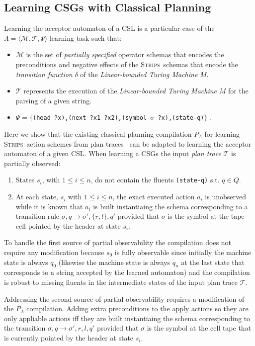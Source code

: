 \documentclass[letterpaper]{article} %
\newcommand{\tup}[1]{{\langle #1 \rangle}}
\newcommand{\strips}{\textsc{Strips}}     %
\begin{document}
\subsection{Learning CSGs with Classical Planning}
Learning the acceptor automaton of a CSL is a particular case of the $\Lambda=\tup{\mathcal{M},\mathcal{T},\Psi}$ learning task such that:
\begin{itemize}
\item $\mathcal{M}$ is the set of {\em partially specified} operator schemas that encodes the preconditions and negative effects of the \strips\ schemas that encode the {\em transition function} $\delta$ of the {\em Linear-bounded Turing Machine} $M$.
\item $\mathcal{T}$ represents the execution of the {\em Linear-bounded Turing Machine} $M$ for the parsing of a given string.
\item $\Psi=\{${\small\tt(head ?x),(next ?x1 ?x2),(symbol-$\sigma$ ?x),(state-q)}$\}$ . 
\end{itemize}

Here we show that the existing classical planning compilation $P_{\Lambda}$ for learning \strips\ action schemes from plan traces~\cite{aineto:learningSTRIPS:ICAPS2018} can be adapted to learning the acceptor automaton of a given CSL. When learning a CSGs the input {\em plan trace} $\mathcal{T}$ is partially observed:
\begin{enumerate}
\item States $s_i$, with $1\leq i\leq n$, do not contain the fluents {\tt (state-q)} s.t. $q\in Q$.
\item At each state, $s_i$ with $1\leq i\leq n$, the exact executed action $a_i$ is unobserved while it is known that $a_i$ is built instantiaing the schema corresponding to a transition rule $\sigma,q\rightarrow \sigma',\{r,l\},q'$ provided that $\sigma$ is the symbol at the tape cell pointed by the header at state $s_i$.
\end{enumerate}
To handle the first source of partial observability the compilation does not require any modification because $s_0$ is fully observable since initially the machine state is always $q_0$ (likewise the machine state is always $q_n$ at the last state that corresponds to a string accepted by the learned automaton) and the compilation is robust to missing fluents in the intermediate states of the input plan trace $\mathcal{T}$.

Addressing the second source of partial observability requires a modification of the $P_{\Lambda}$ compilation. Adding extra preconditions to the apply actions so they are  only appliable actions iff they are built instantiaing the schema corresponding to the transition $\sigma,q\rightarrow \sigma',{r,l},q'$ provided that $\sigma$ is the symbol at the cell tape that is currently pointed by the header at state $s_i$.
\end{document}
